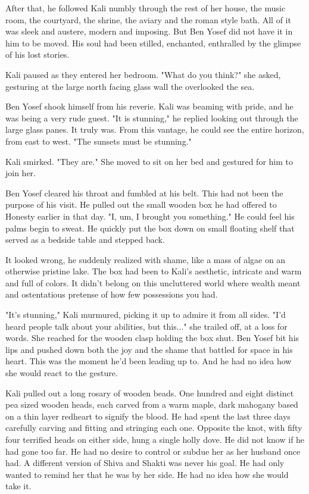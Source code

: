 \documentclass{amsart}
\begin{document}
After that, he followed Kali numbly through the rest of her house, the music room, the courtyard, the shrine, the aviary and the roman style bath. All of it was sleek and austere, modern and imposing. But Ben Yosef did not have it in him to be moved. His soul had been stilled, enchanted, enthralled by the glimpse of his lost stories. 

Kali paused as they entered her bedroom. "What do you think?" she asked, gesturing at the large north facing glass wall the overlooked the sea. 

Ben Yosef shook himself from his reverie. Kali was beaming with pride, and he was being a very rude guest. "It is stunning," he replied looking out through the large glass panes. It truly was. From this vantage, he could see the entire horizon, from east to west. "The sunsets must be stunning."

Kali smirked. "They are." She moved to sit on her bed and gestured for him to join her.

Ben Yosef cleared his throat and fumbled at his belt. This had not been the purpose of his visit. He pulled out the small wooden box he had offered to Honesty earlier in that day. "I, um, I brought you something." He could feel his palms begin to sweat. He quickly put the box down on small floating shelf that served as a bedside table and stepped back.

It looked wrong, he suddenly realized with shame, like a mass of algae on an otherwise pristine lake. The box had been to Kali's aesthetic, intricate and warm and full of colors. It didn't belong on this uncluttered world where wealth meant and ostentatious pretense of how few possessions you had.

"It's stunning," Kali murmured, picking it up to admire it from all sides. "I'd heard people talk about your abilities, but this..." she trailed off, at a loss for words. She reached for the wooden clasp holding the box shut. Ben Yosef bit his lips and pushed down both the joy and the shame that battled for space in his heart. This was the moment he'd been leading up to. And he had no idea how she would react to the gesture.

Kali pulled out a long rosary of wooden beads. One hundred and eight distinct pea sized wooden heads, each carved from a warm maple, dark mahogany based on a thin layer redheart to signify the blood. He had spent the last three days carefully carving and fitting and stringing each one. Opposite the knot, with fifty four terrified heads on either side, hung a single holly dove. He did not know if he had gone too far. He had no desire to control or subdue her as her husband once had. A different version of Shiva and Shakti was never his goal. He had only wanted to remind her that he was by her side. He had no idea how she would take it. 
\end{document}
